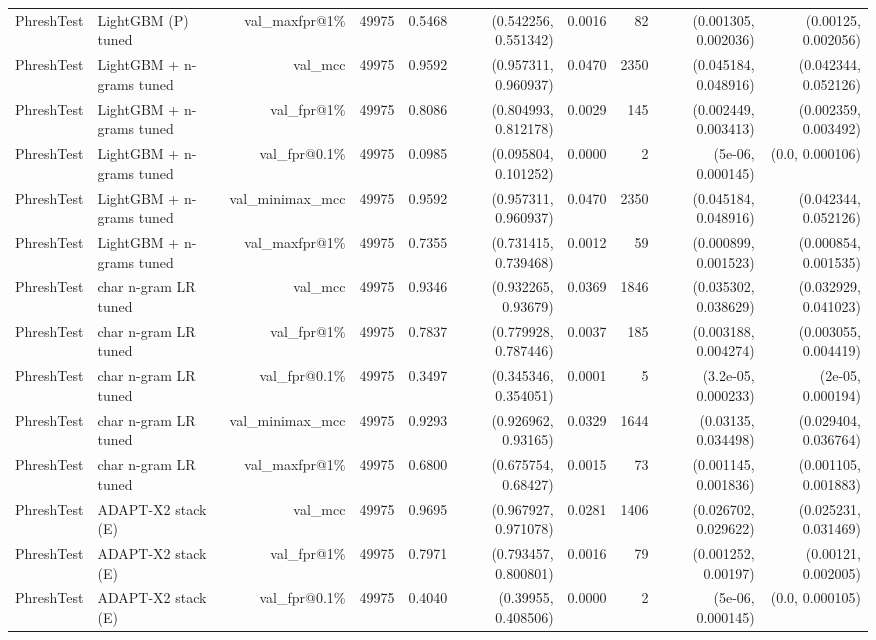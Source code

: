 \begin{table}[t]
\begin{tabular}{llrrrrrrrr}
PhreshTest & LightGBM (P) tuned & val\_maxfpr@1\% & 49975 & 0.5468 & (0.542256, 0.551342) & 0.0016 & 82 & (0.001305, 0.002036) & (0.00125, 0.002056) \\
PhreshTest & LightGBM + n-grams tuned & val\_mcc & 49975 & 0.9592 & (0.957311, 0.960937) & 0.0470 & 2350 & (0.045184, 0.048916) & (0.042344, 0.052126) \\
PhreshTest & LightGBM + n-grams tuned & val\_fpr@1\% & 49975 & 0.8086 & (0.804993, 0.812178) & 0.0029 & 145 & (0.002449, 0.003413) & (0.002359, 0.003492) \\
PhreshTest & LightGBM + n-grams tuned & val\_fpr@0.1\% & 49975 & 0.0985 & (0.095804, 0.101252) & 0.0000 & 2 & (5e-06, 0.000145) & (0.0, 0.000106) \\
PhreshTest & LightGBM + n-grams tuned & val\_minimax\_mcc & 49975 & 0.9592 & (0.957311, 0.960937) & 0.0470 & 2350 & (0.045184, 0.048916) & (0.042344, 0.052126) \\
PhreshTest & LightGBM + n-grams tuned & val\_maxfpr@1\% & 49975 & 0.7355 & (0.731415, 0.739468) & 0.0012 & 59 & (0.000899, 0.001523) & (0.000854, 0.001535) \\
PhreshTest & char n-gram LR tuned & val\_mcc & 49975 & 0.9346 & (0.932265, 0.93679) & 0.0369 & 1846 & (0.035302, 0.038629) & (0.032929, 0.041023) \\
PhreshTest & char n-gram LR tuned & val\_fpr@1\% & 49975 & 0.7837 & (0.779928, 0.787446) & 0.0037 & 185 & (0.003188, 0.004274) & (0.003055, 0.004419) \\
PhreshTest & char n-gram LR tuned & val\_fpr@0.1\% & 49975 & 0.3497 & (0.345346, 0.354051) & 0.0001 & 5 & (3.2e-05, 0.000233) & (2e-05, 0.000194) \\
PhreshTest & char n-gram LR tuned & val\_minimax\_mcc & 49975 & 0.9293 & (0.926962, 0.93165) & 0.0329 & 1644 & (0.03135, 0.034498) & (0.029404, 0.036764) \\
PhreshTest & char n-gram LR tuned & val\_maxfpr@1\% & 49975 & 0.6800 & (0.675754, 0.68427) & 0.0015 & 73 & (0.001145, 0.001836) & (0.001105, 0.001883) \\
PhreshTest & ADAPT-X2 stack (E) & val\_mcc & 49975 & 0.9695 & (0.967927, 0.971078) & 0.0281 & 1406 & (0.026702, 0.029622) & (0.025231, 0.031469) \\
PhreshTest & ADAPT-X2 stack (E) & val\_fpr@1\% & 49975 & 0.7971 & (0.793457, 0.800801) & 0.0016 & 79 & (0.001252, 0.00197) & (0.00121, 0.002005) \\
PhreshTest & ADAPT-X2 stack (E) & val\_fpr@0.1\% & 49975 & 0.4040 & (0.39955, 0.408506) & 0.0000 & 2 & (5e-06, 0.000145) & (0.0, 0.000105) \\

\end{tabular}
\end{table}
